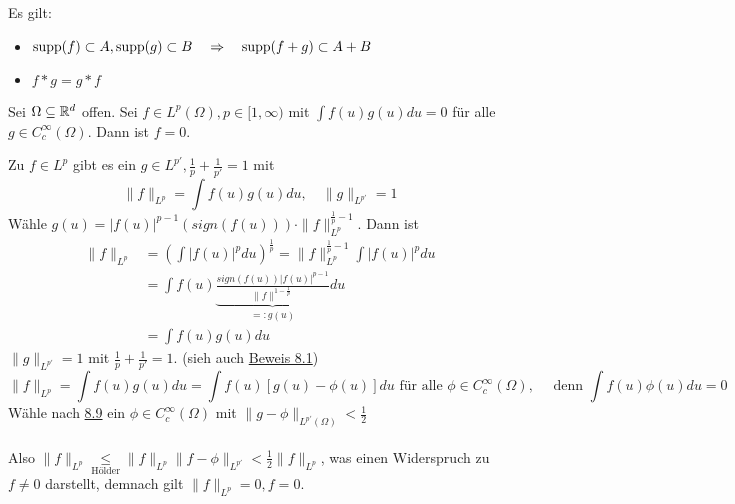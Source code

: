 \begin{bemerkung*}
	Es gilt:
	\begin{itemize}
		\item $\operatorname{supp}(f) \subset A, \operatorname{supp}(g) \subset B \quad \Rightarrow  \quad \operatorname{supp}(f + g) \subset A + B $
		\item $f \ast g = g \ast f$
	\end{itemize}	
\end{bemerkung*}


\begin{kor} \label{kor:8.10}
	Sei $\Omega \subseteq \mathbb{R}^{d}$ offen. Sei $f \in L^{p}(\Omega), p \in [1, \infty)$ mit $\int f(u) g(u) du = 0$ für alle $g \in C_{c}^{\infty}(\Omega)$. Dann ist $f = 0$.
	\begin{beweis}
		Zu $f \in L^{p}$ gibt es ein $g \in L^{p'}, \frac{1}{p} + \frac{1}{p'} = 1$ mit 
		\[ \| f \|_{L^{p}} = \int f(u) g(u) du, \quad \| g \|_{L^{p'}} = 1 \]
		Wähle $g(u) = |f(u)|^{p - 1} \left( sign(f(u)) \right) \cdot \| f \|_{L^{p}}^{\frac{1}{p} - 1}$. Dann ist
		\begin{align*}
			\| f \|_{L^{p}} & = \left( \int |f(u)|^{p} du \right)^{\frac{1}{p}} = \| f \|_{L^{p}}^{\frac{1}{p} - 1} \int |f(u)|^{p} du \\
			& = \int f(u) \underbrace{\frac{sign(f(u)) |f(u)|^{p - 1}}{\| f \|^{1 - \frac{1}{p}}}}_{=: g(u)} du \\
			& = \int f(u) g(u) du
		\end{align*}
		$\| g \|_{L^{p'}} = 1$ mit $\frac{1}{p} + \frac{1}{p'} = 1$. (sieh auch \hyperref[satz:8.1]{Beweis 8.1}) 
		\[ \| f \|_{L^{p}} = \int f(u) g(u) du = \int f(u) [g(u) - \phi(u)] du \text{ für alle } \phi \in C_{c}^{\infty}(\Omega), \quad \text{ denn } \int f(u) \phi(u) du = 0 \]
		Wähle nach \hyperref[kor:8.9]{8.9} ein $\phi \in C_{c}^{\infty}(\Omega)$ mit $\| g - \phi \|_{L^{p'}(\Omega)} < \frac{1}{2}$ \\ \\
		Also $\| f \|_{L^{p}} \underset{\text{Hölder}}{\leq} \| f \|_{L^{p}} \| f - \phi \|_{L^{p'}} < \frac{1}{2} \| f \|_{L^{p}}$, was einen Widerspruch zu $f \neq 0$ darstellt, demnach gilt $\| f \|_{L^{p}} = 0, f = 0$.
	\end{beweis}
\end{kor}



\newpage	